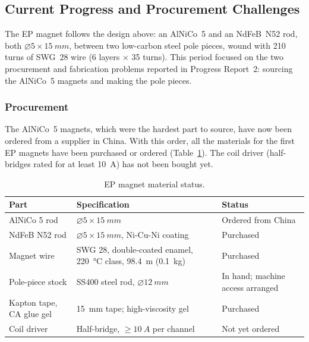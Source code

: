 \documentclass[12pt,a4paper]{article}
\begin{document}
\subsection{Current Progress and Procurement Challenges}
\label{sec:ep-progress}

The EP magnet follows the design above: an AlNiCo~5 and an NdFeB~N52 rod, both
$\varnothing5\times\SI{15}{mm}$, between two low-carbon steel pole pieces, wound with 210
turns of SWG~28 wire (6 layers $\times$ 35 turns). This period focused on the two
procurement and fabrication problems reported in Progress Report~2: sourcing the AlNiCo~5 magnets and making the pole pieces.

\subsubsection{Procurement}

The AlNiCo~5 magnets, which were the hardest part to source, have now been ordered from a
supplier in China. With this order, all the materials for the first EP magnets have been
purchased or ordered (Table~\ref{pr3:tab:epbom}). The coil driver (half-bridges rated for at
least \SI{10}{A}) has not been bought yet.

\begin{table}[H]
\centering
\caption{EP magnet material status.}
\label{pr3:tab:epbom}
\small
\begin{tabularx}{\linewidth}{l >{\raggedright\arraybackslash}X l}
\toprule
Part & Specification & Status \\
\midrule
AlNiCo 5 rod            & $\varnothing5\times\SI{15}{mm}$ & Ordered from China \\
NdFeB N52 rod           & $\varnothing5\times\SI{15}{mm}$, Ni-Cu-Ni coating & Purchased \\
Magnet wire             & SWG 28, double-coated enamel, \SI{220}{\celsius} class, \SI{98.4}{m} (\SI{0.1}{kg}) & Purchased \\
Pole-piece stock        & SS400 steel rod, $\varnothing\SI{12}{mm}$ & In hand; machine access arranged \\
Kapton tape, CA glue gel& \SI{15}{mm} tape; high-viscosity gel & Purchased \\
Coil driver             & Half-bridge, $\geq\SI{10}{A}$ per channel & Not yet ordered \\
\bottomrule
\end{tabularx}
\end{table}
\end{document}
